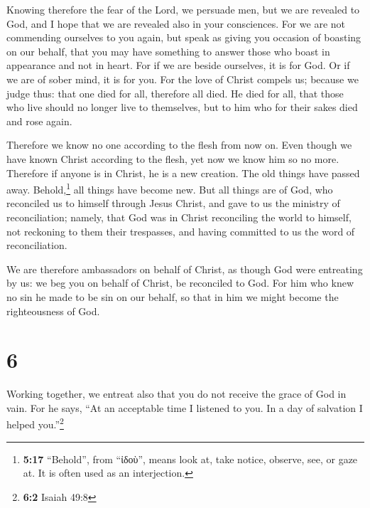  Knowing therefore the fear of the Lord, we persuade men,
but we are revealed to God, and I hope that we are revealed also in your
consciences.  For we are not commending ourselves to you
again, but speak as giving you occasion of boasting on our behalf, that
you may have something to answer those who boast in appearance and not
in heart.  For if we are beside ourselves, it is for God.
Or if we are of sober mind, it is for you.  For the love
of Christ compels us; because we judge thus: that one died for all,
therefore all died.  He died for all, that those who live
should no longer live to themselves, but to him who for their sakes died
and rose again.

 Therefore we know no one according to the flesh from now
on. Even though we have known Christ according to the flesh, yet now we
know him so no more.  Therefore if anyone is in Christ,
he is a new creation. The old things have passed away.
Behold,\footnote{\textbf{5:17} ``Behold'', from ``ἰδοὺ'', means look at,
  take notice, observe, see, or gaze at. It is often used as an
  interjection.} all things have become new.  But all
things are of God, who reconciled us to himself through Jesus Christ,
and gave to us the ministry of reconciliation;  namely,
that God was in Christ reconciling the world to himself, not reckoning
to them their trespasses, and having committed to us the word of
reconciliation.

 We are therefore ambassadors on behalf of Christ, as
though God were entreating by us: we beg you on behalf of Christ, be
reconciled to God.  For him who knew no sin he made to be
sin on our behalf, so that in him we might become the righteousness of
God.

\hypertarget{section-5}{%
\section{6}\label{section-5}}

 Working together, we entreat also that you do not receive
the grace of God in vain.  For he says, ``At an acceptable
time I listened to you. In a day of salvation I helped you.''\footnote{\textbf{6:2}
  Isaiah 49:8}

